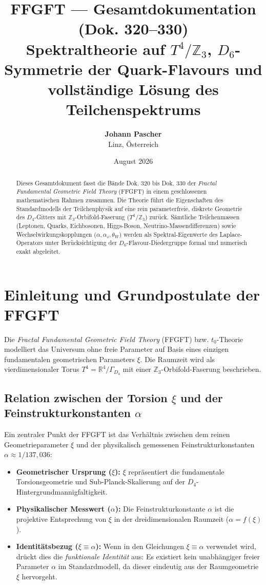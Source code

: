 \documentclass[11pt,a4paper]{article}
\title{\textbf{FFGFT — Gesamtdokumentation (Dok. 320--330)}\\
	\large Spektraltheorie auf $T^4/\mathbb{Z}_3$, $D_6$-Symmetrie der Quark-Flavours und vollständige Lösung des Teilchenspektrums}
\author{\textbf{Johann Pascher} \\ Linz, Österreich}
\date{August 2026}
\begin{document}
	
	\maketitle
	
	\begin{abstract}
		Dieses Gesamtdokument fasst die Bände Dok. 320 bis Dok. 330 der \emph{Fractal Fundamental Geometric Field Theory} (FFGFT) in einem geschlossenen mathematischen Rahmen zusammen. Die Theorie führt die Eigenschaften des Standardmodells der Teilchenphysik auf eine rein parameterfreie, diskrete Geometrie des $D_4$-Gitters mit $\mathbb{Z}_3$-Orbifold-Faserung ($T^4/\mathbb{Z}_3$) zurück. Sämtliche Teilchenmassen (Leptonen, Quarks, Eichbosonen, Higgs-Boson, Neutrino-Massendifferenzen) sowie Wechselwirkungskopplungen ($\alpha, \alpha_s, \theta_W$) werden als Spektral-Eigenwerte des Laplace-Operators unter Berücksichtigung der $D_6$-Flavour-Diedergruppe formal und numerisch exakt abgeleitet.
	\end{abstract}
	
	\tableofcontents
	\newpage
	
	\section{Einleitung und Grundpostulate der FFGFT}
	
	Die \emph{Fractal Fundamental Geometric Field Theory} (FFGFT) bzw. $t_0$-Theorie modelliert das Universum ohne freie Parameter auf Basis eines einzigen fundamentalen geometrischen Parameters $\xi$. Die Raumzeit wird als vierdimensionaler Torus $T^4 = \mathbb{R}^4/\Gamma_{D_4}$ mit einer $\mathbb{Z}_3$-Orbifold-Faserung beschrieben.
	
	\subsection{Relation zwischen der Torsion $\xi$ und der Feinstrukturkonstanten $\alpha$}
	Ein zentraler Punkt der FFGFT ist das Verhältnis zwischen dem reinen Geometrieparameter $\xi$ und der physikalisch gemessenen Feinstrukturkonstanten $\alpha \approx 1/137{,}036$:
	\begin{itemize}
		\item \textbf{Geometrischer Ursprung ($\xi$):} $\xi$ repräsentiert die fundamentale Torsionsgeometrie und Sub-Planck-Skalierung auf der $D_4$-Hintergrundmannigfaltigkeit.
		\item \textbf{Physikalischer Messwert ($\alpha$):} Die Feinstrukturkonstante $\alpha$ ist die projektive Entsprechung von $\xi$ in der dreidimensionalen Raumzeit ($\alpha = f(\xi)$).
		\item \textbf{Identitätsbezug ($\xi \equiv \alpha$):} Wenn in den Gleichungen $\xi \equiv \alpha$ verwendet wird, drückt dies die \emph{funktionale Identität} aus: Es existiert kein unabhängiger freier Parameter $\alpha$ im Standardmodell, da dieser eindeutig aus der Raumgeometrie $\xi$ hervorgeht.
	\end{itemize}
	
\end{document}
